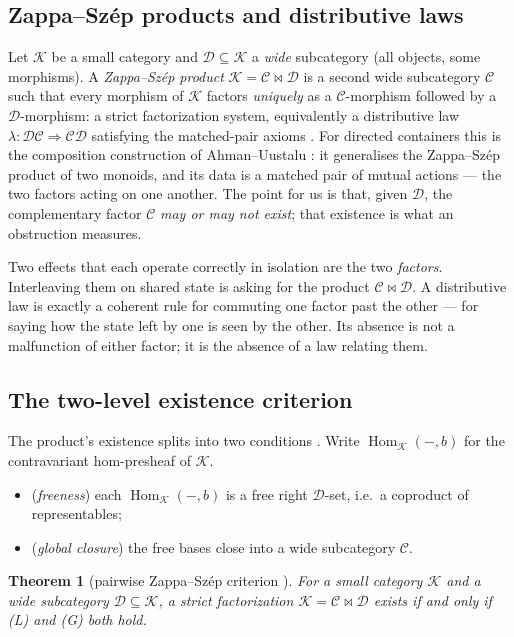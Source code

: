 \documentclass[11pt]{amsart}
\newtheorem{theorem}{Theorem}[section]
\theoremstyle{definition}
\theoremstyle{remark}
\newcommand{\Hom}{\operatorname{Hom}}
\newcommand{\C}{\mathcal{C}}
\newcommand{\D}{\mathcal{D}}
\newcommand{\K}{\mathcal{K}}
\begin{document}
\subsection*{Zappa--Sz\'ep products and distributive laws}
Let $\K$ be a small category and $\D\subseteq\K$ a \emph{wide} subcategory (all objects, some
morphisms). A \emph{Zappa--Sz\'ep product} $\K=\C\bowtie\D$ is a second wide subcategory $\C$ such
that every morphism of $\K$ factors \emph{uniquely} as a $\C$-morphism followed by a $\D$-morphism:
a strict factorization system, equivalently a distributive law $\lambda:\D\C\Rightarrow\C\D$
satisfying the matched-pair axioms \cite{RosebrughWood}. For directed containers this is the
composition construction of Ahman--Uustalu \cite{AhmanUustaluDL}: it generalises the Zappa--Sz\'ep
product of two monoids, and its data is a matched pair of mutual actions --- the two factors acting
on one another. The point for us is that, given $\D$, the complementary factor $\C$ \emph{may or may
not exist}; that existence is what an obstruction measures.

Two effects that each operate correctly in isolation are the two \emph{factors}. Interleaving them
on shared state is asking for the product $\C\bowtie\D$. A distributive law is exactly a coherent
rule for commuting one factor past the other --- for saying how the state left by one is seen by the
other. Its absence is not a malfunction of either factor; it is the absence of a law relating them.

\subsection*{The two-level existence criterion}
The product's existence splits into two conditions \cite{pairwise}. Write $\Hom_\K(-,b)$ for the
contravariant hom-presheaf of $\K$.
\begin{itemize}[leftmargin=2em]
\item[\textbf{(L)}] (\emph{freeness}) each $\Hom_\K(-,b)$ is a free right $\D$-set, i.e.\ a
  coproduct of representables;
\item[\textbf{(G)}] (\emph{global closure}) the free bases close into a wide subcategory $\C$.
\end{itemize}

\begin{theorem}[pairwise Zappa--Sz\'ep criterion \cite{pairwise,RosebrughWood}]\label{thm:pairwise}
For a small category $\K$ and a wide subcategory $\D\subseteq\K$, a strict factorization
$\K=\C\bowtie\D$ exists if and only if \textnormal{(L)} and \textnormal{(G)} both hold.
\end{theorem}
\end{document}
